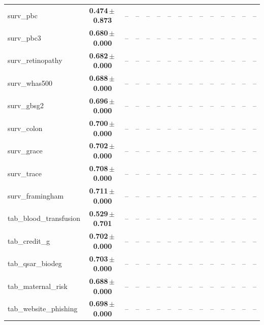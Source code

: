 \documentclass[8pt]{extarticle}
\begin{document}
\begin{longtable}{l*{14}{c}}
surv\_pbc & \textbf{0.474\,$\pm$\,0.873} & -- & -- & -- & -- & -- & -- & -- & -- & -- & -- & -- & -- & -- \\
surv\_pbc3 & \textbf{0.680\,$\pm$\,0.000} & -- & -- & -- & -- & -- & -- & -- & -- & -- & -- & -- & -- & -- \\
surv\_retinopathy & \textbf{0.682\,$\pm$\,0.000} & -- & -- & -- & -- & -- & -- & -- & -- & -- & -- & -- & -- & -- \\
surv\_whas500 & \textbf{0.688\,$\pm$\,0.000} & -- & -- & -- & -- & -- & -- & -- & -- & -- & -- & -- & -- & -- \\
surv\_gbsg2 & \textbf{0.696\,$\pm$\,0.000} & -- & -- & -- & -- & -- & -- & -- & -- & -- & -- & -- & -- & -- \\
surv\_colon & \textbf{0.700\,$\pm$\,0.000} & -- & -- & -- & -- & -- & -- & -- & -- & -- & -- & -- & -- & -- \\
surv\_grace & \textbf{0.702\,$\pm$\,0.000} & -- & -- & -- & -- & -- & -- & -- & -- & -- & -- & -- & -- & -- \\
surv\_trace & \textbf{0.708\,$\pm$\,0.000} & -- & -- & -- & -- & -- & -- & -- & -- & -- & -- & -- & -- & -- \\
surv\_framingham & \textbf{0.711\,$\pm$\,0.000} & -- & -- & -- & -- & -- & -- & -- & -- & -- & -- & -- & -- & -- \\
tab\_blood\_transfusion & \textbf{0.529\,$\pm$\,0.701} & -- & -- & -- & -- & -- & -- & -- & -- & -- & -- & -- & -- & -- \\
tab\_credit\_g & \textbf{0.702\,$\pm$\,0.000} & -- & -- & -- & -- & -- & -- & -- & -- & -- & -- & -- & -- & -- \\
tab\_qsar\_biodeg & \textbf{0.703\,$\pm$\,0.000} & -- & -- & -- & -- & -- & -- & -- & -- & -- & -- & -- & -- & -- \\
tab\_maternal\_risk & \textbf{0.688\,$\pm$\,0.000} & -- & -- & -- & -- & -- & -- & -- & -- & -- & -- & -- & -- & -- \\
tab\_website\_phishing & \textbf{0.698\,$\pm$\,0.000} & -- & -- & -- & -- & -- & -- & -- & -- & -- & -- & -- & -- & -- \\
\end{longtable}
\end{document}
